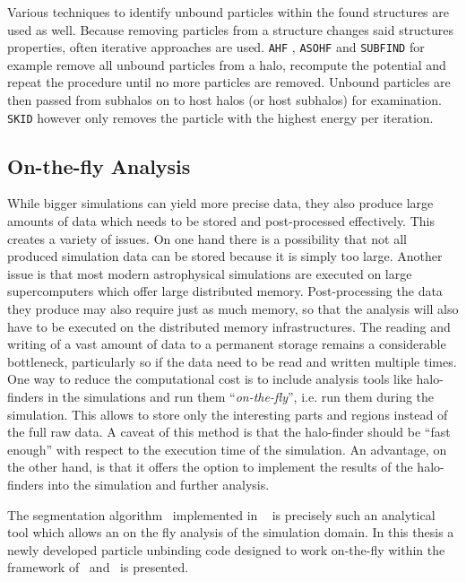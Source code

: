 Various techniques to identify unbound particles within the found structures are used as well.
Because removing particles from a structure changes said structures properties, often iterative approaches are used.
\texttt{AHF} \parencite{AHF}, \texttt{ASOHF} \parencite{ASOHF} and \texttt{SUBFIND} \parencite{subfind} for example remove all unbound particles from a halo, recompute the potential and repeat the procedure until no more particles are removed.
Unbound particles are then passed from subhalos on to host halos (or host subhalos) for examination.
\texttt{SKID} \parencite{skid} however only removes the particle with the highest energy per iteration.







\subsection{On-the-fly Analysis}

While bigger simulations can yield more precise data, they also produce large amounts of data which needs to be stored and post-processed effectively.   
This creates a variety of issues.
On one hand there is a possibility that not all produced simulation data can be stored because it is simply too large. 
Another issue is that most modern astrophysical simulations are executed on large supercomputers which offer large distributed memory. 
Post-processing the data they produce may also require just as much memory, so that the analysis will also have to be executed on the distributed memory infrastructures.
The reading and writing of a vast amount of data to a permanent storage remains a considerable bottleneck, particularly so if the data need to be read and written multiple times.\\
%
One way to reduce the computational cost is to include analysis tools like halo-finders in the simulations and run them ``\textit{on-the-fly}'', i.e. run them during the simulation. 
This allows to store only the interesting parts and regions instead of the full raw data. 
A caveat of this method is that the halo-finder should be ``fast enough'' with respect to the execution time of the simulation.
An advantage, on the other hand, is that it offers the option to implement the results of the halo-finders into the simulation and further analysis.

The segmentation algorithm \phew\ implemented in \ramses\ \parencite{ramses} is precisely such an analytical tool which allows an on the fly analysis of the simulation domain. 
In this thesis a newly developed particle unbinding code designed to work on-the-fly within the framework of \phew\ and \ramses\ is presented.

